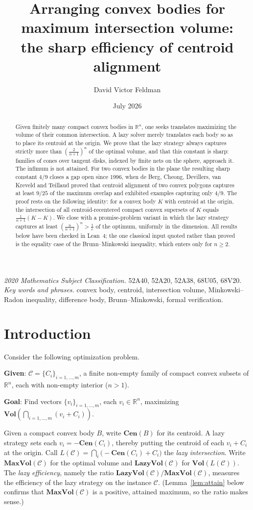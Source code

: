 \documentclass[12pt]{article}
\title{Arranging convex bodies for maximum intersection volume:\\
the sharp efficiency of centroid alignment}
\author{David Victor Feldman}
\date{July 2026}
\theoremstyle{definition}
\newcommand{\R}{\mathbb{R}}
\newcommand{\Vol}{\mathbf{Vol}}
\newcommand{\Cen}{\mathbf{Cen}}
\newcommand{\MV}{\mathbf{MaxVol}}
\newcommand{\LV}{\mathbf{LazyVol}}
\newcommand{\msckeywords}{%
\noindent\footnotesize
\emph{2020 Mathematics Subject Classification.} 52A40, 52A20, 52A38, 68U05,
68V20.\\
\emph{Key words and phrases.} convex body, centroid, intersection volume,
Minkowski--Radon inequality, difference body, Brunn--Minkowski, formal
verification.\par}
\begin{document}
\maketitle

\msckeywords


\begin{abstract}
Given finitely many compact convex bodies in $\R^n$, one seeks translates
maximizing the volume of their common intersection.  A lazy solver merely
translates each body so as to place its centroid at the origin.  We prove
that the lazy strategy always captures strictly more than
$\left(\tfrac{2}{n+1}\right)^n$ of the optimal volume, and that this
constant is sharp: families of cones over tangent disks, indexed by finite
nets on the sphere, approach it.  The infimum is not attained.  For two convex
bodies in the plane the resulting sharp constant $4/9$ closes a gap open
since 1996, when de Berg, Cheong, Devillers, van Kreveld and Teillaud
proved that centroid alignment of two convex polygons captures at least
$9/25$ of the maximum overlap and exhibited examples capturing only $4/9$.
The proof rests on the following identity: for a convex body $K$ with
centroid at the origin, the intersection of all centroid-recentered compact
convex supersets of $K$ equals $\tfrac{1}{n+1}(K-K)$.  We close with a promise-problem variant in which
the lazy strategy captures at least $\left(\tfrac{n}{n+1}\right)^n >
\tfrac1e$ of the optimum, uniformly in the dimension.  All results below
have been checked in Lean~4; the one classical input quoted rather than
proved is the equality case of the Brunn--Minkowski inequality, which
enters only for $n\ge2$.
\end{abstract}

\section{Introduction}

Consider the following optimization problem.

\medskip\noindent
{\bf Given}: $\mathcal{C}=\{C_i\}_{i=1,\ldots,m}$, a finite non-empty
family of compact convex subsets of $\R^n$, each with non-empty interior
($n>1$).

\medskip\noindent
{\bf Goal}: Find vectors $\{v_i\}_{i=1,\ldots,m}$, each $v_i\in\R^n$,
maximizing $\Vol\left(\bigcap_{i=1,\ldots,m} (v_i + C_i)\right)$.

\medskip

Given a compact convex body $B$, write $\Cen(B)$ for its centroid.  A
lazy strategy sets each $v_i=-\Cen(C_i)$, thereby putting the centroid of
each $v_i + C_i$ at the origin.  Call
$L(\mathcal{C})=\bigcap_{i}\bigl(-\Cen(C_i) + C_i\bigr)$ the {\em lazy
intersection}.  Write $\MV(\mathcal{C})$ for the optimal volume and
$\LV(\mathcal{C})$ for $\Vol(L(\mathcal{C}))$.  The {\em lazy
efficiency}, namely the ratio $\LV(\mathcal{C})/\MV(\mathcal{C})$,
measures the efficiency of the lazy strategy on the instance
$\mathcal{C}$.  (Lemma~\ref{lem:attain} below confirms that
$\MV(\mathcal{C})$ is a positive, attained maximum, so the ratio makes
sense.)
\end{document}

